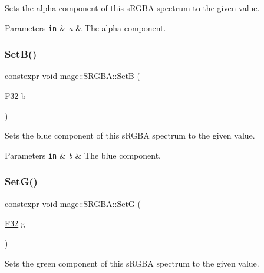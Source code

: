 Sets the alpha component of this s\+R\+G\+BA spectrum to the given value.


\begin{DoxyParams}[1]{Parameters}
\mbox{\tt in}  & {\em a} & The alpha component. \\
\hline
\end{DoxyParams}
\mbox{\label{structmage_1_1_s_r_g_b_a_ae3cd3242e9b75444d8e6ae6bd9098b58}} 
\subsubsection{\texorpdfstring{Set\+B()}{SetB()}}
{\footnotesize\ttfamily constexpr void mage\+::\+S\+R\+G\+B\+A\+::\+SetB (\begin{DoxyParamCaption}\item[{\mbox{\hyperlink{namespacemage_aa97e833b45f06d60a0a9c4fc22ae02c0}{F32}}}]{b }\end{DoxyParamCaption})\hspace{0.3cm}{\ttfamily [noexcept]}}

Sets the blue component of this s\+R\+G\+BA spectrum to the given value.


\begin{DoxyParams}[1]{Parameters}
\mbox{\tt in}  & {\em b} & The blue component. \\
\hline
\end{DoxyParams}
\mbox{\label{structmage_1_1_s_r_g_b_a_a654633df97da325ed0b838e80c6c243e}} 
\subsubsection{\texorpdfstring{Set\+G()}{SetG()}}
{\footnotesize\ttfamily constexpr void mage\+::\+S\+R\+G\+B\+A\+::\+SetG (\begin{DoxyParamCaption}\item[{\mbox{\hyperlink{namespacemage_aa97e833b45f06d60a0a9c4fc22ae02c0}{F32}}}]{g }\end{DoxyParamCaption})\hspace{0.3cm}{\ttfamily [noexcept]}}

Sets the green component of this s\+R\+G\+BA spectrum to the given value.


